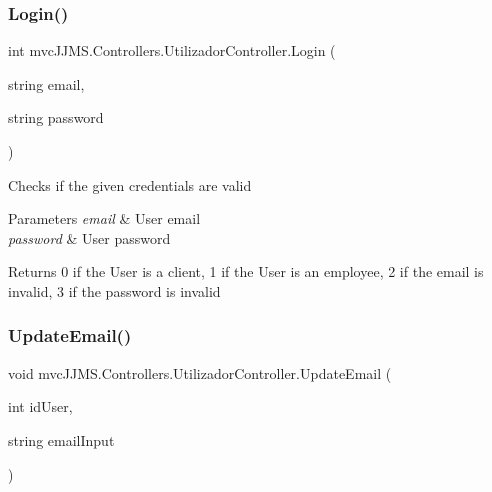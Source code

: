 \subsubsection{\texorpdfstring{Login()}{Login()}}
{\footnotesize\ttfamily int mvc\+J\+J\+M\+S.\+Controllers.\+Utilizador\+Controller.\+Login (\begin{DoxyParamCaption}\item[{string}]{email,  }\item[{string}]{password }\end{DoxyParamCaption})\hspace{0.3cm}{\ttfamily [inline]}}



Checks if the given credentials are valid 


\begin{DoxyParams}{Parameters}
{\em email} & User email\\
\hline
{\em password} & User password\\
\hline
\end{DoxyParams}
\begin{DoxyReturn}{Returns}
0 if the User is a client, 1 if the User is an employee, 2 if the email is invalid, 3 if the password is invalid
\end{DoxyReturn}
\mbox{\label{classmvc_j_j_m_s_1_1_controllers_1_1_utilizador_controller_a11aabb148f5c11805d2fc9955a44a91d}} 
\subsubsection{\texorpdfstring{Update\+Email()}{UpdateEmail()}}
{\footnotesize\ttfamily void mvc\+J\+J\+M\+S.\+Controllers.\+Utilizador\+Controller.\+Update\+Email (\begin{DoxyParamCaption}\item[{int}]{id\+User,  }\item[{string}]{email\+Input }\end{DoxyParamCaption})\hspace{0.3cm}{\ttfamily [inline]}}



